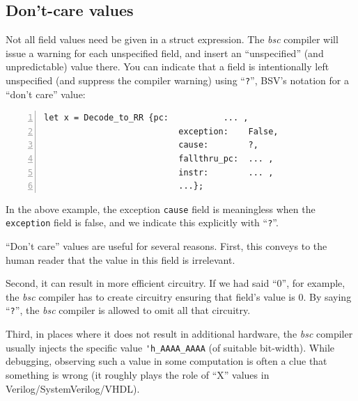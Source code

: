 
\subsection{Don't-care values} 

\label{Sec_Dont_Care_Values}

Not all field values need be given in a struct expression.  The
\emph{bsc} compiler will issue a warning for each unspecified field,
and insert an ``unspecified'' (and unpredictable) value there.  You
can indicate that a field is intentionally left unspecified (and
suppress the compiler warning) using ``\verb|?|'', BSV's notation for
a ``don't care'' value:


{\small
\begin{Verbatim}[frame=single, numbers=left]
      let x = Decode_to_RR {pc:           ... ,
                           exception:    False,
                           cause:        ?,
                           fallthru_pc:  ... ,
                           instr:        ... ,
                           ...};
\end{Verbatim}
}

In the above example, the exception \verb|cause| field is meaningless
when the \verb|exception| field is false, and we indicate this
explicitly with ``\verb|?|''.

``Don't care'' values are useful for several reasons.  First, this
conveys to the human reader that the value in this field is
irrelevant.

Second, it can result in more efficient circuitry.  If we had said
``0'', for example, the \emph{bsc} compiler has to create circuitry
ensuring that field's value is 0. By saying ``\verb|?|'', the
\emph{bsc} compiler is allowed to omit all that circuitry.

Third, in places where it does not result in additional hardware, the
\emph{bsc} compiler usually injects the specific value
\verb|'h_AAAA_AAAA| (of suitable bit-width).  While debugging,
observing such a value in some computation is often a clue that
something is wrong (it roughly plays the role of ``X'' values in
Verilog/SystemVerilog/VHDL).

\vspace{2ex}

